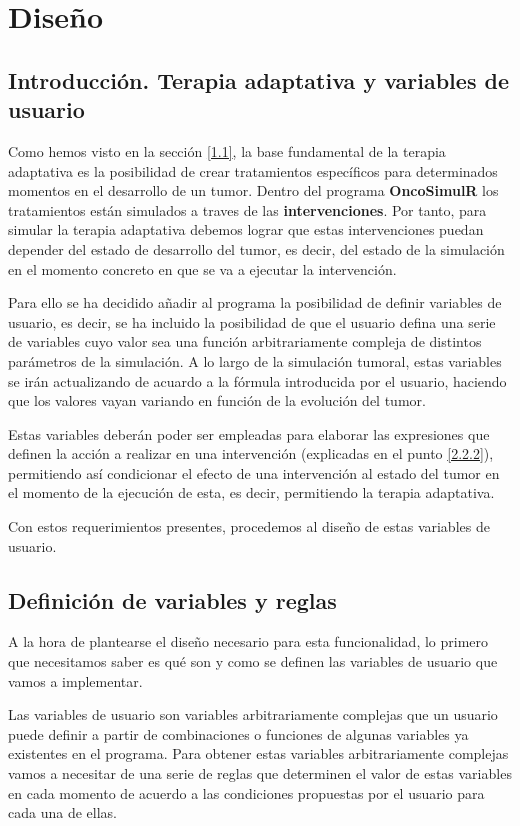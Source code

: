 \chapter{Diseño\label{sec:disenho}}\label{3}

\section{Introducción. Terapia adaptativa y variables de usuario}\label{3.1}

Como hemos visto en la sección \ref{1.1}, la base fundamental de la terapia adaptativa es la posibilidad de crear tratamientos específicos para determinados momentos en el desarrollo de un \gls{tumor}. Dentro del programa \textbf{OncoSimulR} los tratamientos están simulados a traves de las \textbf{intervenciones}. Por tanto, para simular la terapia adaptativa debemos lograr que estas intervenciones puedan depender del  estado de desarrollo del \gls{tumor}, es decir, del estado de la simulación en el momento concreto en que se va a ejecutar la intervención.

Para ello se ha decidido añadir al programa la posibilidad de definir variables de usuario, es decir, se ha incluido la posibilidad de que el usuario defina una serie de variables cuyo valor sea una función arbitrariamente compleja de distintos parámetros de la simulación. A lo largo de la simulación tumoral, estas variables se irán actualizando de acuardo a la fórmula introducida por el usuario, haciendo que los valores vayan variando en función de la evolución del \gls{tumor}. 

Estas variables deberán poder ser empleadas para elaborar las expresiones que definen la acción a realizar en una intervención (explicadas en el punto \ref{2.2.2}), permitiendo así condicionar el efecto de una intervención al estado del \gls{tumor} en el momento de la ejecución de esta, es decir, permitiendo la terapia adaptativa.

Con estos requerimientos presentes, procedemos al diseño de estas variables de usuario.

\section{Definición de variables y reglas}\label{3.2}
A la hora de plantearse el diseño necesario para esta funcionalidad, lo primero que necesitamos saber es qué son y como se definen las variables de usuario que vamos a implementar.

Las variables de usuario son variables arbitrariamente complejas que un usuario puede definir a partir de combinaciones o funciones de algunas variables ya existentes en el programa. Para obtener estas variables arbitrariamente complejas vamos a necesitar de una serie de reglas que determinen el valor de estas variables en cada momento de acuerdo a las condiciones propuestas por el usuario para cada una de ellas.


